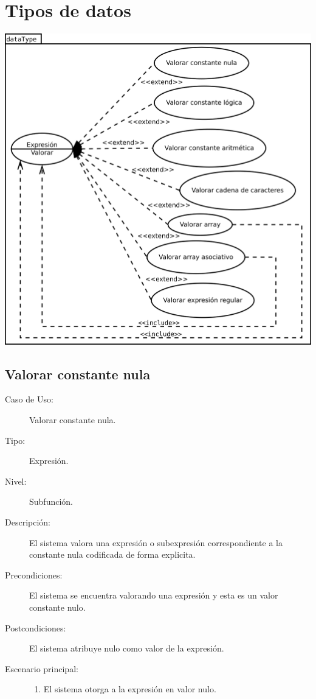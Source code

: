 \section {Tipos de datos}
\begin{center}
\includegraphics[scale=0.4]{dataType.png} \\
\end{center}
\subsection{Valorar constante nula}
\begin{framed}
\FloatBarrier
\begin{description}
   \item[Caso de Uso:] Valorar constante nula.
   \item [Tipo:] Expresión.
   \item[Nivel:]  Subfunción.
   \item[Descripción:] 
   El sistema valora una expresión o subexpresión correspondiente a
   la constante nula codificada de forma explicita.
   \item[Precondiciones:] 
   El sistema se encuentra valorando una expresión y esta es un valor constante nulo.
   \item[Postcondiciones:] 
   El sistema atribuye nulo como valor de la expresión.
   \item[Escenario principal:] \hfill
   \begin{enumerate}
   \item El sistema otorga a la expresión en valor nulo.
   \end{enumerate}
\end{description}
 \FloatBarrier
\end{framed}

